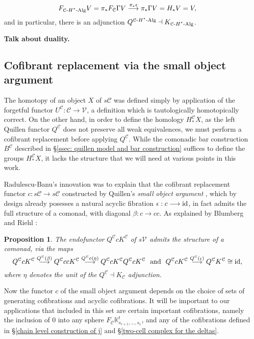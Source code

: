 \documentclass[11pt]{amsart}
\theoremstyle{plain}
\newtheorem{prop}[thm]{Proposition}
\theoremstyle{definition}
\renewcommand{\to}{\longrightarrow}
\newcommand{\calC}{\mathcal{C}}
\newcommand{\calV}{\mathcal{V}}
\newcommand{\calc}{\mathcal{C}}
\theoremstyle{plain}
\newcommand{\vect}[2]{\calV^{#1}_{#2}}
\newcommand{\HAlg}{\textup{-$H^*$-Alg}}
\newcommand{\Id}{\textup{id}}
\begin{document}
\begin{CPiAlgs and CHalgs}
\[F_{\calc\HAlg}V=\pi_*F_\calc\Gamma V\overset{\pi_*\epsilon}{\to}\pi_*\Gamma V=H_*V=V,\]
and in particular, there is an adjunction $Q^{\calc\HAlg}\dashv K_{\calc\HAlg}$.

\textbf{Talk about duality.}

\subsection{Cofibrant replacement via the small object argument}\label{Cofibrant replacement via the small object argument}
The homotopy of an object $X$ of $s\calC$ was defined simply by application of the forgetful functor $U^{\calc}:\calc\to\vect{}{}$, a definition which is tautologically homotopically correct. On the other hand, in order to define the homology $H_*^{\calc}X$, as the left Quillen functor $Q^{\calc}$ does not preserve all weak equivalences, we must perform a cofibrant replacement before applying $Q^{\calc}$. While the comonadic bar construction $B^{\calc}$ described in \S\ref{ssec: quillen model and bar construction} suffices to define the groups $H_*^{\calc}X$, it lacks the structure that we will need at various points in this work.

Radulescu-Banu's innovation \cite{Radulescu-Banu.pdf} was to explain that the cofibrant replacement functor $c:s\calC\to s\calC$ constructed by Quillen's \emph{small object argument}  \cite{QuillenHomAlg.pdf}, which by design already posesses a natural acyclic fibration $\epsilon:c\to\Id$, in fact admits the full structure of a comonad, with diagonal $\beta:c\to cc$. As explained by Blumberg and Riehl \cite[Remark 4.12]{BlumRiehlResolutions.pdf}:
\begin{prop}
The endofunctor $Q^\calc cK^\calc$ of $s\vect{}{}$ admits the structure of a comonad, via the maps
\[Q^\calc cK^\calc\overset{\smash{Q^\calc (\beta)}}{\to}Q^\calc ccK^\calc \overset{\smash{Q^\calc c(\eta)}}{\to} Q^\calc cK^\calc Q^\calc cK^\calc\text{ \ and \ }Q^\calc cK^\calc\overset{\smash{Q^\calc (\epsilon)}}{\to}Q^\calc K^\calc\cong\Id,\]
where $\eta$ denotes the unit of the $Q^\calC\dashv K_\calC$ adjunction.
\end{prop}

Now the functor $c$ of the small object argument depends on the choice of sets of generating cofibrations and acyclic cofibrations. It will be important to our applications that included in this set are certain important cofibrations, namely the inclusion of $0$ into any sphere $F_\calC\mathbb{K}^t_{s_{r+1},\ldots,s_1}$, and any of the cofibrations  defined in \S\ref{chain level construction of j} and \S\ref{two-cell complex for the deltas}.


\end{CPiAlgs and CHalgs}
\end{document}

